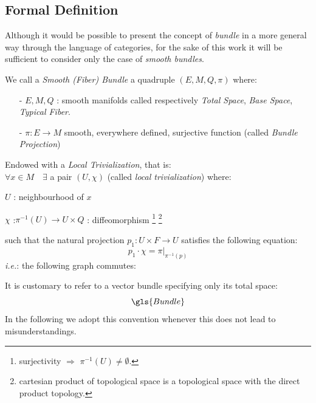 \documentclass[Main]{subfiles}
\begin{document}
		\subsection{Formal Definition}
			Although it would be possible to present the concept of \emph{bundle} in a more general way through the language of categories, for the sake of this work it will be sufficient to consider only the case of \emph{smooth bundles}.
			\begin{definition}\label{Def:SmoothBundle}
				We call a \emph{Smooth (Fiber) Bundle}  a quadruple $(E,M,Q,\pi)$ where:
				\begin{itemize}
					\item[-] $E,M,Q$ :  smooth manifolds called respectively \emph{Total Space}, \emph{Base Space}, \emph{Typical Fiber}.
					\item[-] $\pi : E \rightarrow M $ smooth, everywhere defined, surjective function (called \emph{Bundle Projection})
				\end{itemize}
				Endowed with a \emph{Local Trivialization}, that is:\\
				$\forall x \in M \quad \exists$ a pair $(U, \chi)$ (called \emph{local trivialization}) where:
					\begin{compactitemize}
						\item $U$ : neighbourhood of $x$
						\item $\chi$ :$\pi^{-1}(U) \rightarrow U \times Q$ : diffeomorphism
 							\footnote{surjectivity $\Rightarrow$ $\pi^{-1}(U) \neq \emptyset$.} 
 							\footnote{cartesian product of topological space is a topological space with the direct product topology.}
					\end{compactitemize}
				such that the natural projection $p_1 : U \times F \rightarrow U$ satisfies the following equation: $$p_1 \cdot \chi = \pi \vert_{\pi^{-1}(p)}$$
					\textit{i.e.}: the following graph commutes:
					\vspace{-2mm}		
					\begin{center}
					\end{center}

			\end{definition}
				It is customary to refer to a vector bundle specifying only its total space:
				\begin{displaymath}
					\gls{Bundle}%
				\end{displaymath}
			 	In the following we adopt this convention whenever this does not lead to misunderstandings.
\end{document}
